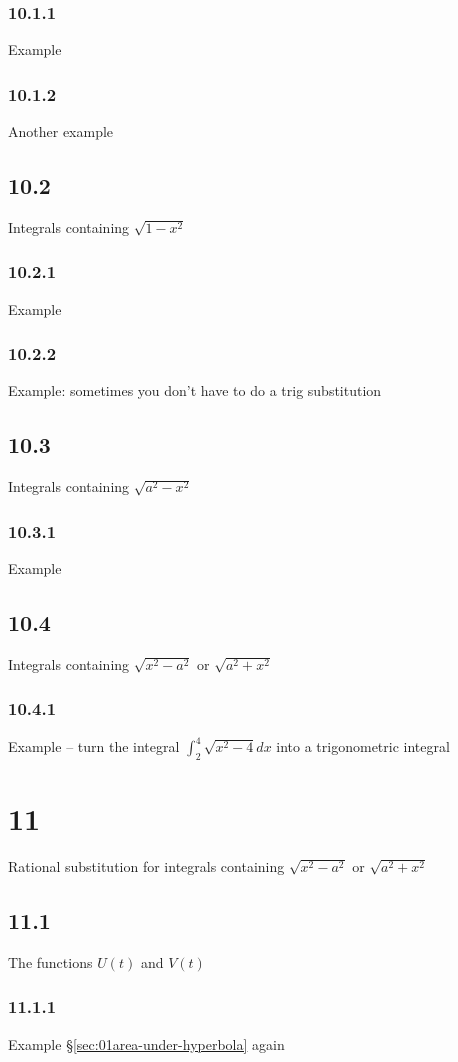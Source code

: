 \subsubsection{10.1.1}{Example}
\subsubsection{10.1.2}{Another example}
\subsection{10.2}{Integrals containing $\sqrt {1-x^2}$}
\subsubsection{10.2.1}{Example}
\subsubsection{10.2.2}{Example: sometimes you don't have to do a trig substitution}
\subsection{10.3}{Integrals containing $\sqrt {a^2-x^2}$}
\subsubsection{10.3.1}{Example}
\subsection{10.4}{Integrals containing $\sqrt {x^2-a^2}$ or $\sqrt {a^2+x^2}$}
\subsubsection{10.4.1}{Example -- turn the integral $\int_2^4 \sqrt {x^2-4}{d}x$ into a trigonometric integral}
\section{11}{Rational substitution for integrals containing $\sqrt {x^2-a^2}$ or $\sqrt {a^2+x^2}$}
\subsection{11.1}{The functions $U(t)$ and $V(t)$}
\subsubsection{11.1.1}{Example \S \ref {sec:01area-under-hyperbola} again}
